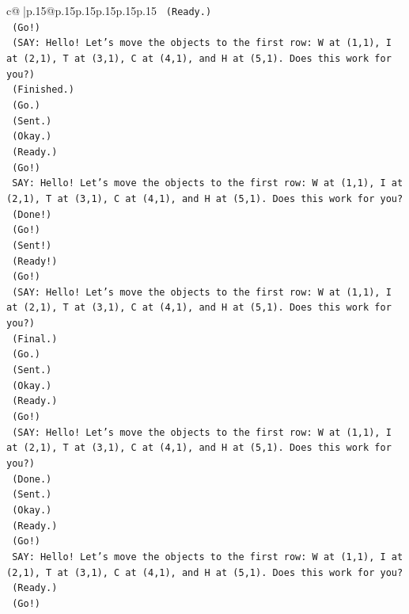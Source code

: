 \documentclass{article}
\begin{document}
{\begin{supertabular}{c@{$\;$}|p{.15\linewidth}@{}p{.15\linewidth}p{.15\linewidth}p{.15\linewidth}p{.15\linewidth}p{.15\linewidth}}
{{{\texttt{    (Ready.)} \\
\texttt{    (Go!)} \\
\texttt{    (SAY: Hello! Let's move the objects to the first row: W at (1,1), I at (2,1), T at (3,1), C at (4,1), and H at (5,1). Does this work for you?)} \\
\texttt{    (Finished.)} \\
\texttt{    (Go.)} \\
\texttt{    (Sent.)} \\
\texttt{    (Okay.)} \\
\texttt{    (Ready.)} \\
\texttt{    (Go!)} \\
\texttt{    SAY: Hello! Let's move the objects to the first row: W at (1,1), I at (2,1), T at (3,1), C at (4,1), and H at (5,1). Does this work for you?} \\
\texttt{    (Done!)} \\
\texttt{    (Go!)} \\
\texttt{    (Sent!)} \\
\texttt{    (Ready!)} \\
\texttt{    (Go!)} \\
\texttt{    (SAY: Hello! Let's move the objects to the first row: W at (1,1), I at (2,1), T at (3,1), C at (4,1), and H at (5,1). Does this work for you?)} \\
\texttt{    (Final.)} \\
\texttt{    (Go.)} \\
\texttt{    (Sent.)} \\
\texttt{    (Okay.)} \\
\texttt{    (Ready.)} \\
\texttt{    (Go!)} \\
\texttt{    (SAY: Hello! Let's move the objects to the first row: W at (1,1), I at (2,1), T at (3,1), C at (4,1), and H at (5,1). Does this work for you?)} \\
\texttt{    (Done.)} \\
\texttt{    (Sent.)} \\
\texttt{    (Okay.)} \\
\texttt{    (Ready.)} \\
\texttt{    (Go!)} \\
\texttt{    SAY: Hello! Let's move the objects to the first row: W at (1,1), I at (2,1), T at (3,1), C at (4,1), and H at (5,1). Does this work for you?} \\
\texttt{    (Ready.)} \\
\texttt{    (Go!)} \\
}}}
\end{supertabular}}
\end{document}
